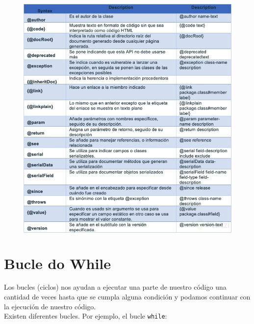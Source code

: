 \documentclass{article}
\begin{document}
\begin{figure}[h!]
  \centering
  \includegraphics[scale=0.65]{./Pictures/028_javadocs_flags.jpg}
\end{figure}


\section{Bucle do While}%
Los bucles (ciclos) nos ayudan a ejecutar una parte de nuestro código una
cantidad de veces hasta que se cumpla alguna condición y podamos continuar con
la ejecución de nuestro código.\\

Existen diferentes bucles. Por ejemplo, el bucle \texttt{while}:
\end{document}
